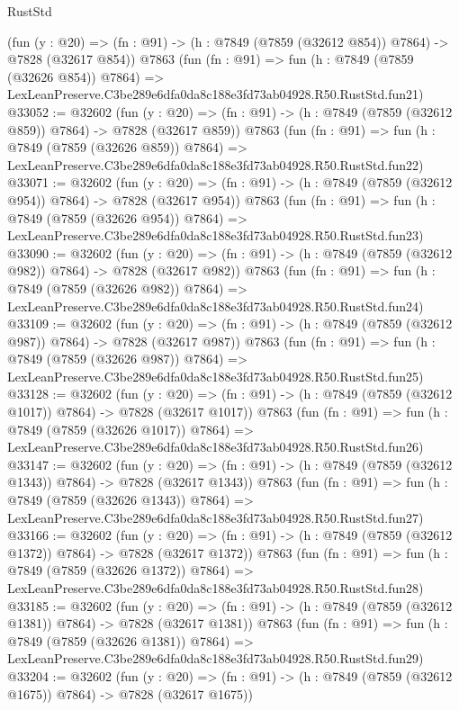 \begin{lexlean}{RustStd}
\begin{coremodule}
    (fun (y : @20) => (fn : @91) -> (h : @7849 (@7859 (@32612 @854)) @7864) -> @7828 (@32617 @854))
    @7863
    (fun (fn : @91) =>
    fun (h : @7849 (@7859 (@32626 @854)) @7864) =>
    LexLeanPreserve.C3be289e6dfa0da8c188e3fd73ab04928.R50.RustStd.fun21)
@33052 := @32602
    (fun (y : @20) => (fn : @91) -> (h : @7849 (@7859 (@32612 @859)) @7864) -> @7828 (@32617 @859))
    @7863
    (fun (fn : @91) =>
    fun (h : @7849 (@7859 (@32626 @859)) @7864) =>
    LexLeanPreserve.C3be289e6dfa0da8c188e3fd73ab04928.R50.RustStd.fun22)
@33071 := @32602
    (fun (y : @20) => (fn : @91) -> (h : @7849 (@7859 (@32612 @954)) @7864) -> @7828 (@32617 @954))
    @7863
    (fun (fn : @91) =>
    fun (h : @7849 (@7859 (@32626 @954)) @7864) =>
    LexLeanPreserve.C3be289e6dfa0da8c188e3fd73ab04928.R50.RustStd.fun23)
@33090 := @32602
    (fun (y : @20) => (fn : @91) -> (h : @7849 (@7859 (@32612 @982)) @7864) -> @7828 (@32617 @982))
    @7863
    (fun (fn : @91) =>
    fun (h : @7849 (@7859 (@32626 @982)) @7864) =>
    LexLeanPreserve.C3be289e6dfa0da8c188e3fd73ab04928.R50.RustStd.fun24)
@33109 := @32602
    (fun (y : @20) => (fn : @91) -> (h : @7849 (@7859 (@32612 @987)) @7864) -> @7828 (@32617 @987))
    @7863
    (fun (fn : @91) =>
    fun (h : @7849 (@7859 (@32626 @987)) @7864) =>
    LexLeanPreserve.C3be289e6dfa0da8c188e3fd73ab04928.R50.RustStd.fun25)
@33128 := @32602
    (fun (y : @20) =>
    (fn : @91) -> (h : @7849 (@7859 (@32612 @1017)) @7864) -> @7828 (@32617 @1017))
    @7863
    (fun (fn : @91) =>
    fun (h : @7849 (@7859 (@32626 @1017)) @7864) =>
    LexLeanPreserve.C3be289e6dfa0da8c188e3fd73ab04928.R50.RustStd.fun26)
@33147 := @32602
    (fun (y : @20) =>
    (fn : @91) -> (h : @7849 (@7859 (@32612 @1343)) @7864) -> @7828 (@32617 @1343))
    @7863
    (fun (fn : @91) =>
    fun (h : @7849 (@7859 (@32626 @1343)) @7864) =>
    LexLeanPreserve.C3be289e6dfa0da8c188e3fd73ab04928.R50.RustStd.fun27)
@33166 := @32602
    (fun (y : @20) =>
    (fn : @91) -> (h : @7849 (@7859 (@32612 @1372)) @7864) -> @7828 (@32617 @1372))
    @7863
    (fun (fn : @91) =>
    fun (h : @7849 (@7859 (@32626 @1372)) @7864) =>
    LexLeanPreserve.C3be289e6dfa0da8c188e3fd73ab04928.R50.RustStd.fun28)
@33185 := @32602
    (fun (y : @20) =>
    (fn : @91) -> (h : @7849 (@7859 (@32612 @1381)) @7864) -> @7828 (@32617 @1381))
    @7863
    (fun (fn : @91) =>
    fun (h : @7849 (@7859 (@32626 @1381)) @7864) =>
    LexLeanPreserve.C3be289e6dfa0da8c188e3fd73ab04928.R50.RustStd.fun29)
@33204 := @32602
    (fun (y : @20) =>
    (fn : @91) -> (h : @7849 (@7859 (@32612 @1675)) @7864) -> @7828 (@32617 @1675))

\end{coremodule}
\end{lexlean}
